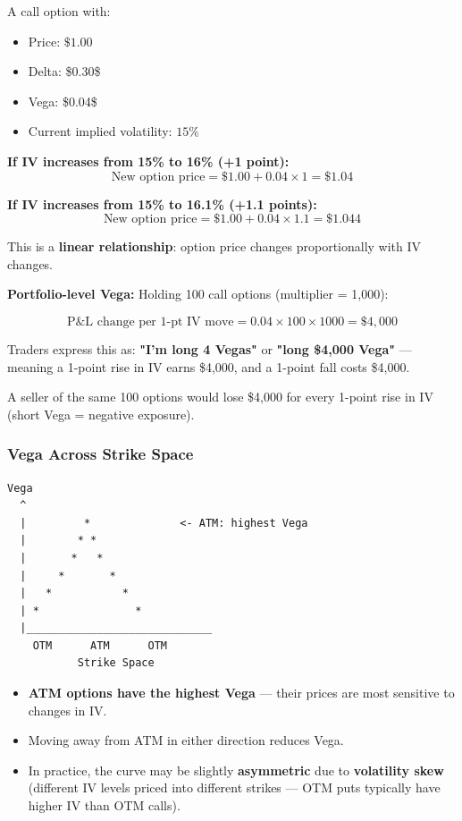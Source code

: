 \documentclass[12pt,openany]{book}
\begin{document}
A call option with:
\begin{itemize}[leftmargin=*]
    \item Price: \(\$1.00\)
    \item Delta: \$0.30\$
    \item Vega: \$0.04\$
    \item Current implied volatility: \(15\%\)
\end{itemize}

\textbf{If IV increases from 15\% to 16\% (+1 point):}
\[
\text{New option price} = \$1.00 + 0.04 \times 1 = \$1.04
\]

\textbf{If IV increases from 15\% to 16.1\% (+1.1 points):}
\[
\text{New option price} = \$1.00 + 0.04 \times 1.1 = \$1.044
\]

This is a \textbf{linear relationship}: option price changes proportionally with IV changes.

\textbf{Portfolio-level Vega:}
Holding 100 call options (multiplier = 1,000):

\[
\text{P\&L change per 1-pt IV move} = 0.04 \times 100 \times 1000 = \$4{,}000
\]

Traders express this as: \textbf{"I'm long 4 Vegas"} or \textbf{"long \$4,000 Vega"} — meaning a 1-point rise in IV earns \$4,000, and a 1-point fall costs \$4,000.

A seller of the same 100 options would lose \$4,000 for every 1-point rise in IV (short Vega = negative exposure).

\subsubsection{Vega Across Strike Space}

\begin{center}
\begin{Verbatim}[fontsize=\small,breaklines=true]
Vega
  ^
  |         *              <- ATM: highest Vega
  |        * *
  |       *   *
  |     *       *
  |   *           *
  | *               *
  |_____________________________
    OTM      ATM      OTM
           Strike Space
\end{Verbatim}
\end{center}

\begin{itemize}[leftmargin=*]
    \item \textbf{ATM options have the highest Vega} — their prices are most sensitive to changes in IV.
    \item Moving away from ATM in either direction reduces Vega.
    \item In practice, the curve may be slightly \textbf{asymmetric} due to \textbf{volatility skew} (different IV levels priced into different strikes — OTM puts typically have higher IV than OTM calls).
\end{itemize}
\end{document}
